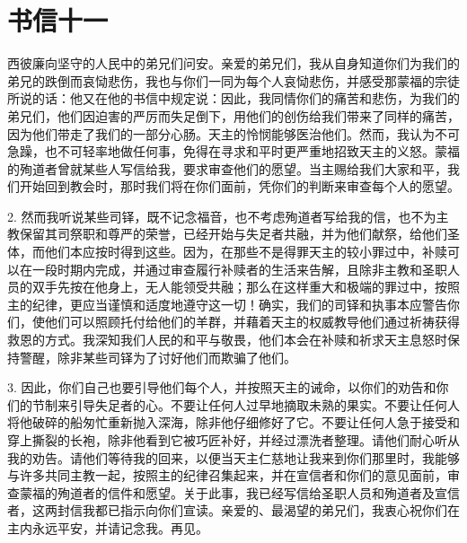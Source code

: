 

\section{书信十一}

\par

\par

西彼廉向坚守的人民中的弟兄们问安。亲爱的弟兄们，我从自身知道你们为我们的弟兄的跌倒而哀恸悲伤，我也与你们一同为每个人哀恸悲伤，并感受那蒙福的宗徒所说的话：他又在他的书信中规定说：因此，我同情你们的痛苦和悲伤，为我们的弟兄们，他们因迫害的严厉而失足倒下，用他们的创伤给我们带来了同样的痛苦，因为他们带走了我们的一部分心肠。天主的怜悯能够医治他们。然而，我认为不可急躁，也不可轻率地做任何事，免得在寻求和平时更严重地招致天主的义怒。蒙福的殉道者曾就某些人写信给我，要求审查他们的愿望。当主赐给我们大家和平，我们开始回到教会时，那时我们将在你们面前，凭你们的判断来审查每个人的愿望。\par

2. 然而我听说某些司铎，既不记念福音，也不考虑殉道者写给我的信，也不为主教保留其司祭职和尊严的荣誉，已经开始与失足者共融，并为他们献祭，给他们圣体，而他们本应按时得到这些。因为，在那些不是得罪天主的较小罪过中，补赎可以在一段时期内完成，并通过审查履行补赎者的生活来告解，且除非主教和圣职人员的双手先按在他身上，无人能领受共融；那么在这样重大和极端的罪过中，按照主的纪律，更应当谨慎和适度地遵守这一切！确实，我们的司铎和执事本应警告你们，使他们可以照顾托付给他们的羊群，并藉着天主的权威教导他们通过祈祷获得救恩的方式。我深知我们人民的和平与敬畏，他们本会在补赎和祈求天主息怒时保持警醒，除非某些司铎为了讨好他们而欺骗了他们。\par

3. 因此，你们自己也要引导他们每个人，并按照天主的诫命，以你们的劝告和你们的节制来引导失足者的心。不要让任何人过早地摘取未熟的果实。不要让任何人将他破碎的船匆忙重新抛入深海，除非他仔细修好了它。不要让任何人急于接受和穿上撕裂的长袍，除非他看到它被巧匠补好，并经过漂洗者整理。请他们耐心听从我的劝告。请他们等待我的回来，以便当天主仁慈地让我来到你们那里时，我能够与许多共同主教一起，按照主的纪律召集起来，并在宣信者和你们的意见面前，审查蒙福的殉道者的信件和愿望。关于此事，我已经写信给圣职人员和殉道者及宣信者，这两封信我都已指示向你们宣读。亲爱的、最渴望的弟兄们，我衷心祝你们在主内永远平安，并请记念我。再见。\par

